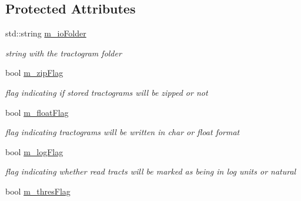 \subsection*{\-Protected \-Attributes}
\begin{DoxyCompactItemize}
\item 
\hypertarget{classfileManager_ac999ca3ac4fe64e4d0ae9a8b62819951}{std\-::string \hyperlink{classfileManager_ac999ca3ac4fe64e4d0ae9a8b62819951}{m\-\_\-io\-Folder}}\label{classfileManager_ac999ca3ac4fe64e4d0ae9a8b62819951}

\begin{DoxyCompactList}\small\item\em string with the tractogram folder \end{DoxyCompactList}\item 
\hypertarget{classfileManager_ad7198eaa800af79393c3a1b1f0230c2c}{bool \hyperlink{classfileManager_ad7198eaa800af79393c3a1b1f0230c2c}{m\-\_\-zip\-Flag}}\label{classfileManager_ad7198eaa800af79393c3a1b1f0230c2c}

\begin{DoxyCompactList}\small\item\em flag indicating if stored tractograms will be zipped or not \end{DoxyCompactList}\item 
\hypertarget{classfileManager_a1d0dfda9faa7ed11266c35f5024a640f}{bool \hyperlink{classfileManager_a1d0dfda9faa7ed11266c35f5024a640f}{m\-\_\-float\-Flag}}\label{classfileManager_a1d0dfda9faa7ed11266c35f5024a640f}

\begin{DoxyCompactList}\small\item\em flag indicating tractograms will be written in char or float format \end{DoxyCompactList}\item 
\hypertarget{classfileManager_a718e251b28be9f876098744cc32833e3}{bool \hyperlink{classfileManager_a718e251b28be9f876098744cc32833e3}{m\-\_\-log\-Flag}}\label{classfileManager_a718e251b28be9f876098744cc32833e3}

\begin{DoxyCompactList}\small\item\em flag indicating whether read tracts will be marked as being in log units or natural \end{DoxyCompactList}\item 
\hypertarget{classfileManager_a92cc74ee728d730f300295224ab356a1}{bool \hyperlink{classfileManager_a92cc74ee728d730f300295224ab356a1}{m\-\_\-thres\-Flag}}\label{classfileManager_a92cc74ee728d730f300295224ab356a1}


\end{DoxyCompactItemize}
